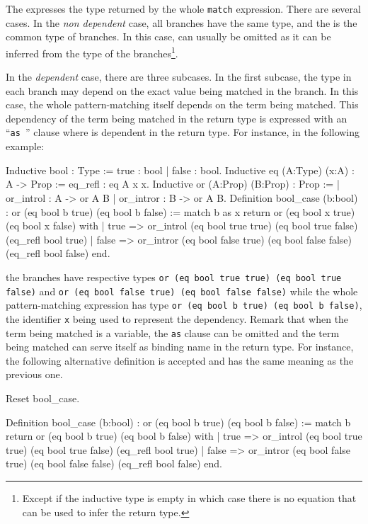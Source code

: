 The {\returntype} expresses the type returned by the whole {\tt match}
expression. There are several cases.  In the {\em non dependent} case,
all branches have the same type, and the {\returntype} is the common
type of branches. In this case, {\returntype} can usually be omitted
as it can be inferred from the type of the branches\footnote{Except if
the inductive type is empty in which case there is no equation that can be 
used to infer the return type.}.

In the {\em dependent} case, there are three subcases. In the first
subcase, the type in each branch may depend on the exact value being
matched in the branch. In this case, the whole pattern-matching itself
depends on the term being matched. This dependency of the term being
matched in the return type is expressed with an ``{\tt as {\ident}}''
clause where {\ident} is dependent in the return type.
For instance, in the following example:
\begin{coq_example*}
Inductive bool : Type := true : bool | false : bool.
Inductive eq (A:Type) (x:A) : A -> Prop := eq_refl : eq A x x.
Inductive or (A:Prop) (B:Prop) : Prop :=
| or_introl : A -> or A B
| or_intror : B -> or A B.
Definition bool_case (b:bool) : or (eq bool b true) (eq bool b false)
:= match b as x return or (eq bool x true) (eq bool x false) with
   | true  => or_introl (eq bool true true) (eq bool true false)
                (eq_refl bool true)
   | false => or_intror (eq bool false true) (eq bool false false)
                (eq_refl bool false)
   end.
\end{coq_example*}
the branches have respective types {\tt or (eq bool true true) (eq
bool true false)} and {\tt or (eq bool false true) (eq bool false
false)} while the whole pattern-matching expression has type {\tt or
(eq bool b true) (eq bool b false)}, the identifier {\tt x} being used
to represent the dependency.  Remark that when the term being matched
is a variable, the {\tt as} clause can be omitted and the term being
matched can serve itself as binding name in the return type. For
instance, the following alternative definition is accepted and has the
same meaning as the previous one.
\begin{coq_eval}
Reset bool_case.
\end{coq_eval}
\begin{coq_example*}
Definition bool_case (b:bool) : or (eq bool b true) (eq bool b false)
:= match b return or (eq bool b true) (eq bool b false) with
   | true  => or_introl (eq bool true true) (eq bool true false)
                (eq_refl bool true)
   | false => or_intror (eq bool false true) (eq bool false false)
                (eq_refl bool false)
   end.
\end{coq_example*}

